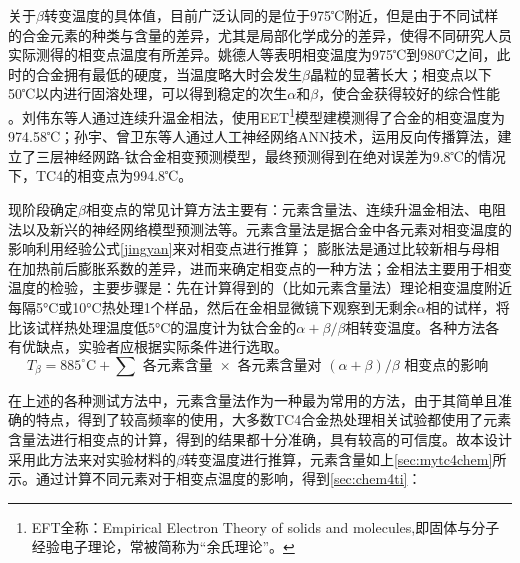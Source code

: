 关于$\beta$转变温度的具体值，目前广泛认同的是位于975℃附近，但是由于不同试样的合金元素的种类与含量的差异，尤其是局部化学成分的差异，使得不同研究人员实际测得的相变点温度有所差异\cite{wangtaoTC4hejinxiangbianwendujiancezhongjieguobuyizhiyuanyinfenxi2013}。姚德人等\cite{yaoderenTc4taihejinxiangbiandiandeceding1975}表明相变温度为975℃到980℃之间，此时的合金拥有最低的硬度，当温度略大时会发生$\beta$晶粒的显著长大；相变点以下50℃以内进行固溶处理，可以得到稳定的次生$ \alpha$和$ \beta $，使合金获得较好的综合性能%
。刘伟东等人\cite{liuweidongTC4hejinVzhuanbianwendudejinxiangfacedingyulilunjisuan2014}通过连续升温金相法，使用EET\footnote{EFT全称：Empirical Electron Theory of solids and molecules,即固体与分子经验电子理论，常被简称为“余氏理论”。}模型建模测得了\ti 合金的相变温度为974.58℃；孙宇、曾卫东等人\cite{sunyuYingyongrengongshenjingwangluoyanjiuhuaxueyuansuduitaihejinxiangbiandiandeyingxiang2010}通过人工神经网络ANN技术，运用反向传播算法，建立了三层神经网路-钛合金相变预测模型，最终预测得到在绝对误差为9.8℃的情况下，TC4的相变点为994.8℃。

现阶段确定$ \beta $相变点的常见计算方法\cite{zhuhongTaihejinaVxiangbiandiandejizhongceshifangfatantao2013}主要有：元素含量法、连续升温金相法、电阻法以及新兴的神经网络模型预测法\cite{renchiqiangGurongshixiaoduiTC4taihejinxianweizuzhihelixuexingnengdeyingxiang2022}等。元素含量法是据合金中各元素对相变温度的影响\cite{ananyaLocationBasedIntelligent2011}利用经验公式\ref{jingyan}来对相变点进行推算；%
膨胀法是通过比较新相与母相在加热前后膨胀系数的差异，进而来确定相变点的一种方法；金相法主要用于相变温度的检验，主要步骤是：先在计算得到的（比如元素含量法）理论相变温度附近每隔5°C或10°C热处理1个样品，然后在金相显微镜下观察到无剩余$\alpha$相的试样，将比该试样热处理温度低5°C的温度计为钛合金的$\alpha+\beta/\beta$相转变温度。各种方法各有优缺点，实验者应根据实际条件进行选取。
\begin{equation}
	T_\beta=885^{\circ} \mathrm{C}+\sum \textit{ 各元素含量 } \times \textit{ 各元素含量对 }(\alpha+\beta) / \beta \textit{ 相变点的影响 }
	\label{jingyan}
\end{equation}

在上述的各种测试方法中，元素含量法作为一种最为常用的方法，由于其简单且准确的特点，得到了较高频率的使用，大多数TC4合金热处理相关试验都使用了元素含量法进行相变点的计算\cite{LiuLeiTi6Al4VTaiHeJinBuTongReChuLiFangFaDeShiYanYuFuHeCaiLiaoLiXueXingNengFenXi2022,zouhaibeiTC4taihejinrechuliqianghuagongyijixiangbianhangweiyanjiu2019,liutaoRechuliduiTC4taihejindongtailixuexingnengheweiguanzuzhideyingxiang,baoxuechunRechuligongyiduiTC4taihejinzuzhihelixuexingnengdeyingxiang2019,wangpuqiangButongrechuligongyixiajiguangzengcaizhizaoTC4taihejinzuzhiyuxingnengyanjiujinzhan2020}，得到的结果都十分准确，具有较高的可信度。故本设计采用此方法来对实验材料的$\beta$转变温度进行推算，元素含量如上\ref{sec:mytc4chem}所示。通过计算不同元素对于相变点温度的影响，得到\ref{sec:chem4ti}：

